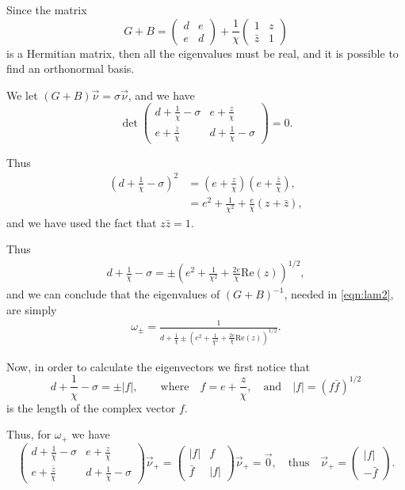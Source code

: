 \documentclass[a4paper,10pt]{article}
\newcommand{\sI}{\ensuremath{\sigma}}
\begin{document}
Since the matrix
% 
\[
  G+B = \begin{pmatrix}d&e\\e&d\end{pmatrix} + \frac{1}{\chi}\begin{pmatrix}1&z\\ \bar{z}&1\end{pmatrix}
\]
% 
is a Hermitian matrix, then all the eigenvalues must be real, and it is possible to find an orthonormal basis.

We let $(G+B)\vec{\nu}=\sI\vec{\nu}$, and we have
% 
\[
  \det\begin{pmatrix} d+\frac{1}{\chi}-\sI&e+\frac{z}{\chi}\\ e+\frac{\bar{z}}{\chi}&d+\frac{1}{\chi}-\sI\end{pmatrix}=0.
\]
% 

Thus
% 
\begin{equation*}
	\begin{split}
		\left(d+\frac{1}{\chi}-\sI \right)^2 &= \left(e+\frac{z}{\chi} \right)\left(e+\frac{\bar{z}}{\chi} \right),\\
		&= e^2 + \frac{1}{\chi^2} + \frac{e}{\chi}(z+\bar{z}),
	\end{split}
\end{equation*}
%
and we have used the fact that $z\bar{z}=1$.

Thus
% 
\begin{equation*}
	\begin{split}
		d+\frac{1}{\chi}-\sI =\pm\left( e^2 + \frac{1}{\chi^2} + \frac{2e}{\chi}\mathrm{Re}(z)\right)^{1/2},
	\end{split}
\end{equation*}
%
and we can conclude that the eigenvalues of $(G+B)^{-1}$, needed in \eqref{eqn:lam2}, are simply
% 
\begin{equation*}
	\begin{split}
	  \omega_{\pm} = \frac{1}{d+\frac{1}{\chi}\pm\left( e^2 + \frac{1}{\chi^2} + \frac{2e}{\chi}\mathrm{Re}(z)\right)^{1/2}}.
	\end{split}
\end{equation*}
%

Now, in order to calculate the eigenvectors we first notice that
% 
\[
  d+\frac{1}{\chi}-\sI = \pm|f|,\qquad\text{where}\quad f=e+\frac{z}{\chi},\quad\text{and}\quad |f|=(f\bar{f})^{1/2}
\]
% 
is the length of the complex vector $f$.

Thus, for $\omega_+$ we have
% 
\[
  \begin{pmatrix} d+\frac{1}{\chi}-\sI&e+\frac{z}{\chi}\\ e+\frac{\bar{z}}{\chi}&d+\frac{1}{\chi}-\sI\end{pmatrix}\vec{\nu}_+=\begin{pmatrix} |f|&f\\ \bar{f}&|f|\end{pmatrix}\vec{\nu}_+ = \vec{0},\quad\text{thus}\quad \vec{\nu}_+ = \begin{pmatrix}|f|\\ -\bar{f} \end{pmatrix}.
\]
% 
\end{document}
